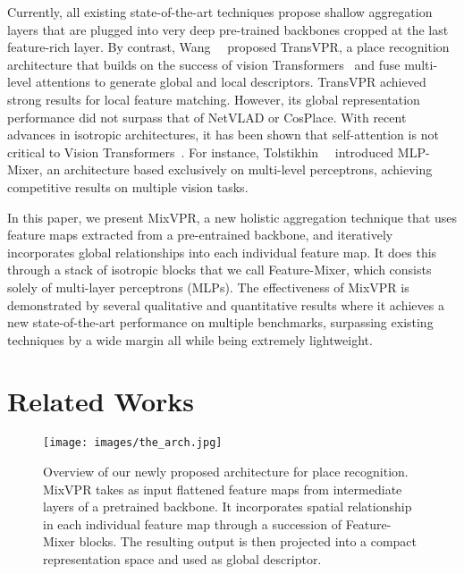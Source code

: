 \documentclass[10pt,twocolumn,letterpaper]{article}
\begin{document}
Currently, all existing state-of-the-art techniques propose shallow aggregation layers that are plugged into very deep pre-trained backbones cropped at the last feature-rich layer. By contrast, Wang~\etal~\cite{wang2022transvpr} proposed TransVPR, a place recognition architecture that builds on the success of vision Transformers~\cite{dosovitskiy2020image} and fuse multi-level attentions to generate global and local descriptors. TransVPR achieved strong results for local feature matching. However, its global representation performance did not surpass that of NetVLAD or CosPlace. With recent advances in isotropic architectures, it has been shown that self-attention is not critical to Vision Transformers~\cite{liu2021pay}. For instance, Tolstikhin~\etal~\cite{tolstikhin2021mlp} introduced MLP-Mixer, an architecture based exclusively on multi-level perceptrons, achieving competitive results on multiple vision tasks. 

In this paper, we present MixVPR, a new holistic aggregation technique that uses feature maps extracted from a pre-entrained backbone, and iteratively incorporates global relationships into each individual feature map. It does this through a stack of isotropic blocks that we call Feature-Mixer, which consists solely of multi-layer perceptrons (MLPs).
The effectiveness of MixVPR is demonstrated by several qualitative and quantitative results where it achieves a new state-of-the-art performance on multiple benchmarks, surpassing existing techniques by a wide margin all while being extremely lightweight.



\section{Related Works}
\begin{figure*}
\begin{center}
 \texttt{[image: images/the\_arch.jpg]}
\end{center} 
\caption{Overview of our newly proposed architecture for place recognition. MixVPR takes as input flattened feature maps from intermediate layers of a pretrained backbone. It incorporates spatial relationship in each individual feature map through a succession of Feature-Mixer blocks. The resulting output is then projected into a compact representation space and used as global descriptor.}
\label{fig:arch}
\end{figure*}
\end{document}
